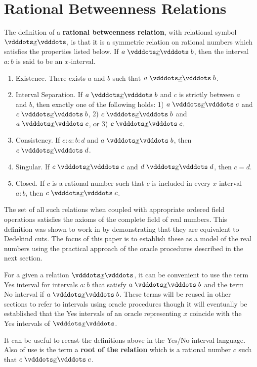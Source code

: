 \documentclass[12pt]{article}
\begin{document}
\section{Rational Betweenness Relations}

The definition of a \textbf{rational betweenness relation}, with relational symbol $\xrel$, is that it is a symmetric relation on rational numbers which satisfies the properties listed below. If $a \xrel b$, then the interval $a:b$ is said to be an $x$-interval. 
\begin{enumerate}
    \item Existence. There exists $a$ and $b$ such that $a\xrel b$.
    \item Interval Separation. If $a \xrel b$ and $c$ is strictly between $a$ and $b$, then exactly one of the following holds: 1) $a \xrel c$ and \sout{$c \xrel b$}, 2) $c \xrel b$ and \sout{$a \xrel c$}, or 3) $c \xrel c$. 
    \item Consistency. If $c : a : b : d$ and $a \xrel b$, then $c \xrel d$. 
    \item Singular. If $c \xrel c$ and $d \xrel d$, then $c=d$. 
    \item Closed. If $c$ is a rational number such that $c$ is included in every $x$-interval $a:b$, then  $c \xrel c$. 
\end{enumerate}

The set of all such relations when coupled with appropriate ordered field operations satisfies the axioms of the complete field of real numbers. This definition was shown to work in \cite{taylor24dedekind} by demonstrating that they are equivalent to Dedekind cuts. The focus of this paper is to establish these as a model of the real numbers using the practical approach of the oracle procedures described in the next section. 

For a given a relation $\xrel$, it can be convenient to use the term Yes interval for intervals $a:b$ that satisfy $a \xrel b$ and the term No interval if \sout{$ a \xrel b$}. These terms will be reused in other sections to refer to intervals using oracle procedures though it will eventually be established that the Yes intervals of an oracle representing $x$ coincide with the Yes intervals of $\xrel$.

It can be useful to recast the definitions above in the Yes/No interval language. Also of use is the term a \textbf{root of the relation} which is a rational number $c$ such that $c \xrel c$.
\end{document}
